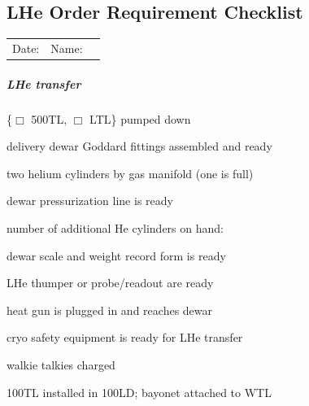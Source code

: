 \begin{appendices}
\noappendicestocpagenum
\addappheadtotoc
\pagebreak
\chapter{LHe Order Requirement Checklist}
\label{appendix:checklist-for-cooldown}


\begin{tabular}{ l r c }
  Date: \underline{\hspace{4cm}} & Name: \underline{\hspace{4cm}}
\end{tabular}

\begin{minipage}{\textwidth}
\paragraph{LHe transfer}
\begin{checklist}
 \item \{$\Box$ 500TL, $\Box$ LTL\} pumped down
 \item delivery dewar Goddard fittings assembled and ready
 \item two helium cylinders by gas manifold (one is full)
 \item dewar pressurization line is ready
 \item number of additional He cylinders on hand: \blankprompt
 \item dewar scale and weight record form is ready
 \item LHe thumper or probe/readout are ready
 \item heat gun is plugged in and reaches dewar
 \item cryo safety equipment is ready for LHe transfer
 \item walkie talkies charged
 \item 100TL installed in 100LD; bayonet attached to WTL

\end{checklist}
\end{minipage}

\begin{minipage}{\textwidth}

\end{minipage}
\end{appendices}
